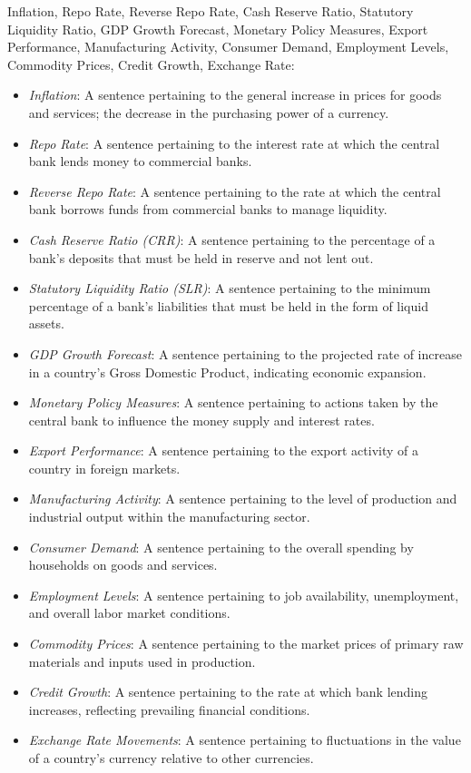  Inflation, Repo Rate, Reverse Repo Rate, Cash Reserve Ratio, Statutory Liquidity Ratio, GDP Growth Forecast, Monetary Policy Measures, Export Performance, Manufacturing Activity, Consumer Demand, Employment Levels, Commodity Prices, Credit Growth, Exchange Rate:

\begin{itemize}
    \item \emph{Inflation}: A sentence pertaining to the general increase in prices for goods and services; the decrease in the purchasing power of a currency.
    \item \emph{Repo Rate}: A sentence pertaining to the interest rate at which the central bank lends money to commercial banks.
    \item \emph{Reverse Repo Rate}: A sentence pertaining to the rate at which the central bank borrows funds from commercial banks to manage liquidity.
    \item \emph{Cash Reserve Ratio (CRR)}: A sentence pertaining to the percentage of a bank's deposits that must be held in reserve and not lent out.
    \item \emph{Statutory Liquidity Ratio (SLR)}: A sentence pertaining to the minimum percentage of a bank's liabilities that must be held in the form of liquid assets.
    \item \emph{GDP Growth Forecast}: A sentence pertaining to the projected rate of increase in a country’s Gross Domestic Product, indicating economic expansion.
    \item \emph{Monetary Policy Measures}: A sentence pertaining to actions taken by the central bank to influence the money supply and interest rates.
    \item \emph{Export Performance}: A sentence pertaining to the export activity of a country in foreign markets.
    \item \emph{Manufacturing Activity}: A sentence pertaining to the level of production and industrial output within the manufacturing sector.
    \item \emph{Consumer Demand}: A sentence pertaining to the overall spending by households on goods and services.
    \item \emph{Employment Levels}: A sentence pertaining to job availability, unemployment, and overall labor market conditions.
    \item \emph{Commodity Prices}: A sentence pertaining to the market prices of primary raw materials and inputs used in production.
    \item \emph{Credit Growth}: A sentence pertaining to the rate at which bank lending increases, reflecting prevailing financial conditions.
    \item \emph{Exchange Rate Movements}: A sentence pertaining to fluctuations in the value of a country’s currency relative to other currencies.
\end{itemize}


